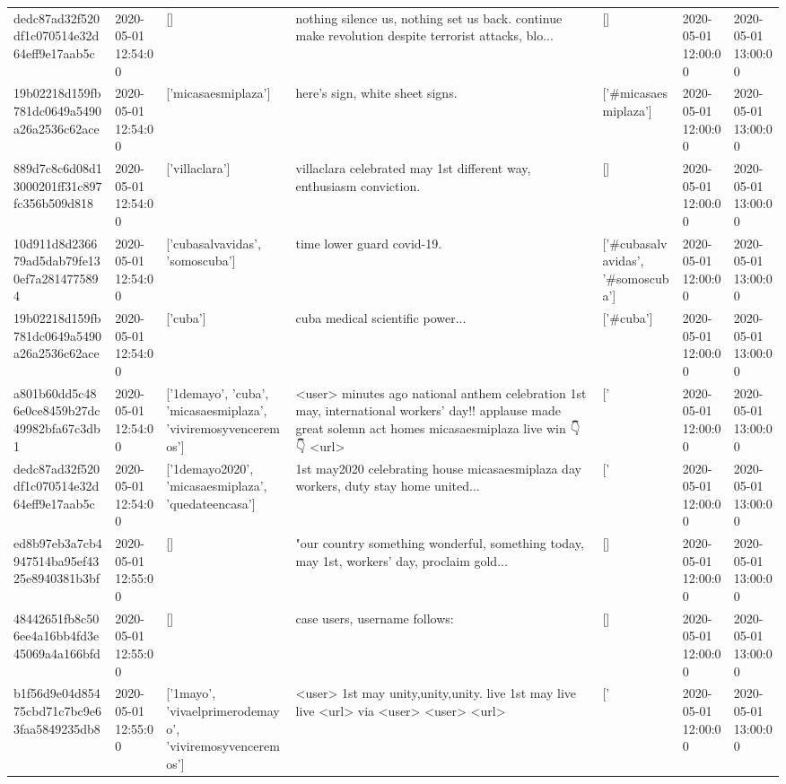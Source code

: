 \begin{tabular}{lllllll}
dedc87ad32f520df1c070514e32d64eff9e17aab5c & 2020-05-01 12:54:00 & [] & nothing silence us, nothing set us back. continue make revolution despite terrorist attacks, blo... & [] & 2020-05-01 12:00:00 & 2020-05-01 13:00:00 \\
19b02218d159fb781dc0649a5490a26a2536c62ace & 2020-05-01 12:54:00 & ['micasaesmiplaza'] & here's sign, white sheet signs. & ['#micasaesmiplaza'] & 2020-05-01 12:00:00 & 2020-05-01 13:00:00 \\
889d7c8c6d08d13000201ff31c897fc356b509d818 & 2020-05-01 12:54:00 & ['villaclara'] & villaclara celebrated may 1st different way, enthusiasm conviction. & [] & 2020-05-01 12:00:00 & 2020-05-01 13:00:00 \\
10d911d8d236679ad5dab79fe130ef7a2814775894 & 2020-05-01 12:54:00 & ['cubasalvavidas', 'somoscuba'] & time lower guard covid-19. & ['#cubasalvavidas', '#somoscuba'] & 2020-05-01 12:00:00 & 2020-05-01 13:00:00 \\
19b02218d159fb781dc0649a5490a26a2536c62ace & 2020-05-01 12:54:00 & ['cuba'] & cuba medical scientific power... & ['#cuba'] & 2020-05-01 12:00:00 & 2020-05-01 13:00:00 \\
a801b60dd5c486e0ce8459b27dc49982bfa67c3db1 & 2020-05-01 12:54:00 & ['1demayo', 'cuba', 'micasaesmiplaza', 'viviremosyvenceremos'] & <user> minutes ago national anthem celebration 1st may, international workers' day!!️ applause made great solemn act homes micasaesmiplaza live win 👇👇 <url> & ['#1demayo', '#cuba', '#micasaesmiplaza', '#viviremosyvenceremos'] & 2020-05-01 12:00:00 & 2020-05-01 13:00:00 \\
dedc87ad32f520df1c070514e32d64eff9e17aab5c & 2020-05-01 12:54:00 & ['1demayo2020', 'micasaesmiplaza', 'quedateencasa'] & 1st may2020 celebrating house micasaesmiplaza day workers, duty stay home united... & ['#1demayo2020', '#micasaesmiplaza', '#quedateencasa'] & 2020-05-01 12:00:00 & 2020-05-01 13:00:00 \\
ed8b97eb3a7cb4947514ba95ef4325e8940381b3bf & 2020-05-01 12:55:00 & [] & "our country something wonderful, something today, may 1st, workers' day, proclaim gold... & [] & 2020-05-01 12:00:00 & 2020-05-01 13:00:00 \\
48442651fb8c506ee4a16bb4fd3e45069a4a166bfd & 2020-05-01 12:55:00 & [] & case users, username follows: & [] & 2020-05-01 12:00:00 & 2020-05-01 13:00:00 \\
b1f56d9e04d85475cbd71c7bc9e63faa5849235db8 & 2020-05-01 12:55:00 & ['1mayo', 'vivaelprimerodemayo', 'viviremosyvenceremos'] & <user> 1st may unity,unity,unity. live 1st may live live <url> via <user> <user> <url> & ['#1mayo', '#vivaelprimerodemayo', '#viviremosyvenceremos'] & 2020-05-01 12:00:00 & 2020-05-01 13:00:00 \\

\end{tabular}
